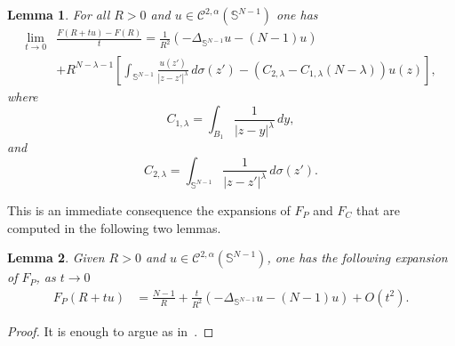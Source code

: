 \documentclass[10pt,reqno,english]{amsart}
\newcommand{\Sn}{\mathbb{S}^{N-1}}
\newtheorem{lemma}{Lemma}[section]
\theoremstyle{definition}
\numberwithin{equation}{section}
\begin{document}
\begin{lemma}
\label{lemma:der}
For all $R>0$ and $u\in\mathcal C^{2,\alpha}(\mathbb S^{N-1})$ one has
\begin{align*}
 \lim_{t\to0}&\frac{  F(R+tu)-F(R)}{t}=\frac{1}{R^2}\left(-\Delta_{\Sn} u-(N-1)u\right)
 \\&+R^{N-\lambda-1}\left[\int_{\mathbb S^{N-1}}\frac{u(z')}{|z-z'|^\lambda}\,d\sigma(z')-(C_{2,\lambda}-C_{1,\lambda}(N-\lambda))u(z)\right],
 \end{align*}
 where
\[
C_{1,\lambda} =\int_{B_1}\frac{1}{|z-y|^\lambda}\,dy,
\]
and
\[
C_{2, \lambda}=\int_{\mathbb S^{N-1}}\frac{1}{|z-z'|^\lambda}\,d\sigma(z').
\]
\end{lemma}

This is an immediate consequence the expansions of $F_P$ and $F_C$ that are computed in the following two lemmas.


\begin{lemma}
Given $R>0$ and $u\in\mathcal C^{2,\alpha}(\mathbb S^{N-1})$, one has the following expansion of $F_P$, as $t\to0$
  \begin{align*}
    F_P(R+tu)&=\frac{N-1}{R}+\frac{t}{R^2}\left(-\Delta_{\Sn} u-(N-1)u\right)+O(t^2).
    \end{align*}
\end{lemma}
\begin{proof}
It is enough to argue as in~\cite[Lemma 14]{Fr19}.
\end{proof}
\end{document}
